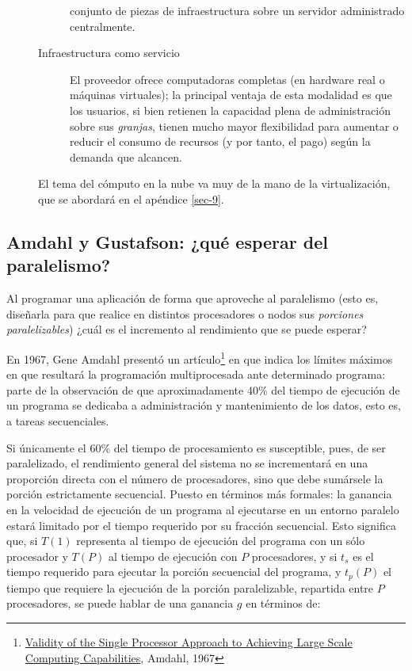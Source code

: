 \documentclass[11pt,fleqn]{book} %
\begin{document}
\begin{description}
\begin{description}
       conjunto de piezas de infraestructura sobre un servidor
       administrado centralmente.
\item[Infraestructura como servicio] El proveedor ofrece computadoras
       completas (en hardware real o máquinas virtuales); la principal
       ventaja de esta modalidad es que los usuarios, si bien retienen
       la capacidad plena de administración sobre sus \emph{granjas},
       tienen mucho mayor flexibilidad para aumentar o reducir el
       consumo de recursos (y por tanto, el pago) según la demanda que
       alcancen.
\end{description}
El tema del cómputo en la nube va muy de la mano de la
  virtualización, que se abordará en el apéndice \ref{sec-9}.
\end{description}
\subsection{Amdahl y Gustafson: ¿qué esperar del paralelismo?}
\label{sec-2-9-3}


Al programar una aplicación de forma que aproveche al paralelismo
(esto es, diseñarla para que realice en distintos procesadores o nodos
sus \emph{porciones paralelizables}) ¿cuál es el incremento al rendimiento
que se puede esperar?

En 1967, Gene Amdahl presentó un artículo\footnote{\href{http://turing.eas.asu.edu/cse520fa08/Alaw.pdf}{Validity of the Single Processor Approach to Achieving Large Scale Computing Capabilities},
Amdahl, 1967 } en que indica los límites máximos en que resultará la
programación multiprocesada ante determinado programa: parte de la
observación de que aproximadamente 40\% del tiempo de ejecución de un
programa se dedicaba a administración y mantenimiento de los datos,
esto es, a tareas secuenciales.

Si únicamente el 60\% del tiempo de procesamiento es susceptible, pues,
de ser paralelizado, el rendimiento general del sistema no se
incrementará en una proporción directa con el número de procesadores,
sino que debe sumársele la porción estrictamente secuencial. Puesto en
términos más formales: la ganancia en la velocidad de ejecución de un
programa al ejecutarse en un entorno paralelo estará limitado por el
tiempo requerido por su fracción secuencial. Esto significa que, si
$T(1)$ representa al tiempo de ejecución del programa con un sólo
procesador y $T(P)$ al tiempo de ejecución con $P$ procesadores, y si
$t_s$ es el tiempo requerido para ejecutar la porción secuencial del
programa, y $t_p(P)$ el tiempo que requiere la ejecución de la porción
paralelizable, repartida entre $P$ procesadores, se puede hablar de una
ganancia $g$ en términos de:
\end{document}
